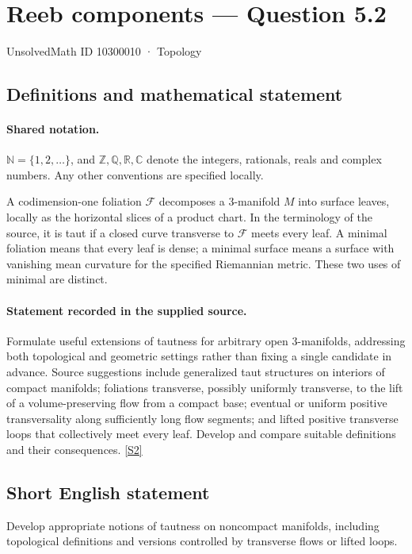 \documentclass[11pt]{article}
\newcommand{\sref}[2]{\hyperlink{source:#1:#2}{[S#2]}}
\begin{document}
\setcounter{section}{10300009}
\section{Reeb components — Question 5.2}\label{10300010}
{\small\sffamily UnsolvedMath ID 10300010 · Topology}
\subsection{Definitions and mathematical statement}

\paragraph{Shared notation.}$\mathbb N=\{1,2,\ldots\}$, and $\mathbb Z,\mathbb Q,\mathbb R,\mathbb C$ denote the integers, rationals, reals and complex numbers. Any other conventions are specified locally.


A codimension-one foliation $\mathcal F$ decomposes a $3$-manifold $M$ into surface leaves, locally as the horizontal slices of a product chart. In the terminology of the source, it is taut if a closed curve transverse to $\mathcal F$ meets every leaf. A minimal foliation means that every leaf is dense; a minimal surface means a surface with vanishing mean curvature for the specified Riemannian metric. These two uses of minimal are distinct.
\paragraph{Statement recorded in the supplied source.}
Formulate useful extensions of tautness for arbitrary open $3$-manifolds, addressing both topological and geometric settings rather than fixing a single candidate in advance. Source suggestions include generalized taut structures on interiors of compact manifolds; foliations transverse, possibly uniformly transverse, to the lift of a volume-preserving flow from a compact base; eventual or uniform positive transversality along sufficiently long flow segments; and lifted positive transverse loops that collectively meet every leaf. Develop and compare suitable definitions and their consequences. \sref{10300010}{2}
\subsection{Short English statement}
Develop appropriate notions of tautness on noncompact manifolds, including topological definitions and versions controlled by transverse flows or lifted loops.
\end{document}
